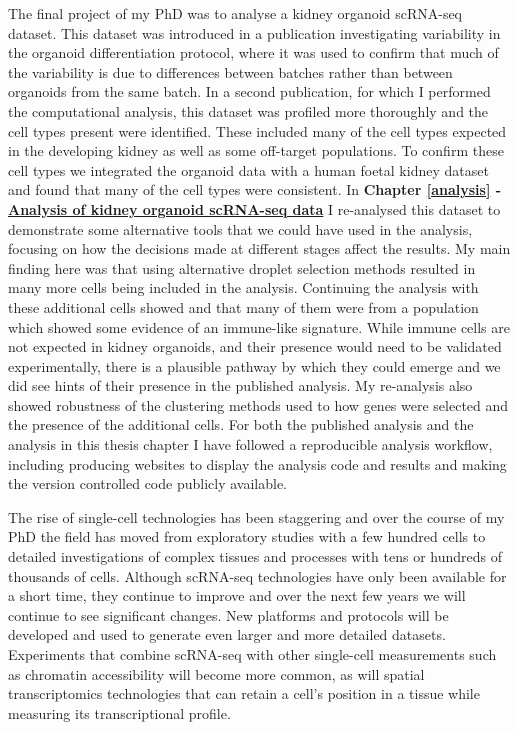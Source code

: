 \documentclass[11pt,a4paper,titlepage,twoside,openright]{style/unimelbthesis}
\theoremstyle{definition}
\theoremstyle{definition}
\theoremstyle{definition}
\theoremstyle{remark}
\begin{document}
\begin{mainmatter}
The final project of my PhD was to analyse a kidney organoid scRNA-seq dataset. This dataset was introduced in a publication investigating variability in the organoid differentiation protocol, where it was used to confirm that much of the variability is due to differences between batches rather than between organoids from the same batch. In a second publication, for which I performed the computational analysis, this dataset was profiled more thoroughly and the cell types present were identified. These included many of the cell types expected in the developing kidney as well as some off-target populations. To confirm these cell types we integrated the organoid data with a human foetal kidney dataset and found that many of the cell types were consistent. In \textbf{Chapter \ref{analysis} - \protect\hyperlink{analysis}{Analysis of kidney organoid scRNA-seq data}} I re-analysed this dataset to demonstrate some alternative tools that we could have used in the analysis, focusing on how the decisions made at different stages affect the results. My main finding here was that using alternative droplet selection methods resulted in many more cells being included in the analysis. Continuing the analysis with these additional cells showed and that many of them were from a population which showed some evidence of an immune-like signature. While immune cells are not expected in kidney organoids, and their presence would need to be validated experimentally, there is a plausible pathway by which they could emerge and we did see hints of their presence in the published analysis. My re-analysis also showed robustness of the clustering methods used to how genes were selected and the presence of the additional cells. For both the published analysis and the analysis in this thesis chapter I have followed a reproducible analysis workflow, including producing websites to display the analysis code and results and making the version controlled code publicly available.

The rise of single-cell technologies has been staggering and over the course of my PhD the field has moved from exploratory studies with a few hundred cells to detailed investigations of complex tissues and processes with tens or hundreds of thousands of cells. Although scRNA-seq technologies have only been available for a short time, they continue to improve and over the next few years we will continue to see significant changes. New platforms and protocols will be developed and used to generate even larger and more detailed datasets. Experiments that combine scRNA-seq with other single-cell measurements such as chromatin accessibility will become more common, as will spatial transcriptomics technologies that can retain a cell's position in a tissue while measuring its transcriptional profile.


\end{mainmatter}
\end{document}
